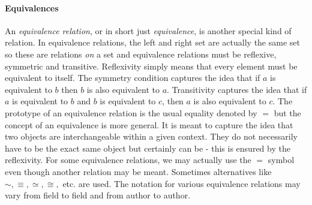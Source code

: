 \paragraph{Equivalences} An \emph{equivalence relation}, or in short just \emph{equivalence}, is another special kind of relation. In equivalence relations, the left and right set are actually the same set so these are relations \emph{on} a set and equivalence relations must be reflexive, symmetric and transitive. Reflexivity simply means that every element must be equivalent to itself. The symmetry condition captures the idea that if $a$ is equivalent to $b$ then $b$ is also equivalent to $a$. Transitivity captures the idea that if $a$ is equivalent to $b$ and $b$ is equivalent to $c$, then $a$ is also equivalent to $c$. The prototype of an equivalence relation is the usual equality denoted by $=$ but the concept of an equivalence is more general. It is meant to capture the idea that two objects are interchangeable within a given context. They do not necessarily have to be the exact same object but certainly can be - this is ensured by the reflexivity. For some equivalence relations, we may actually use the $=$ symbol even though another relation may be meant. Sometimes alternatives like $\sim, \equiv, \simeq, \cong,$ etc. are used. The notation for various equivalence relations may vary from field to field and from author to author. 




